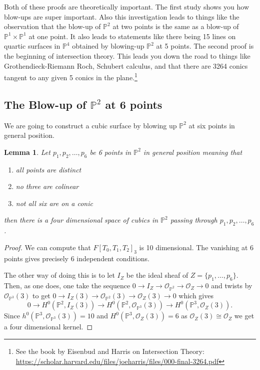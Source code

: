 \documentclass[12pt]{article}
\numberwithin{equation}{section}
\newtheorem{lemma}[theorem]{Lemma}
\theoremstyle{definition}
\theoremstyle{remark}
\newcommand{\Ocal}{\mathcal{O}}
\newcommand{\PP}{\mathbb{P}}
\begin{document}
Both of these proofs are theoretically important. 
The first study shows you how blow-ups are super important. 
Also this investigation leads to things like the observation that the blow-up of $\PP^2$ at two points is the same as a blow-up of $\PP^1\times\PP^1$ at one point. 
It also leads to statements like there being 15 lines on quartic surfaces in $\PP^4$ obtained by blowing-up $\PP^2$ at 5 points. 
The second proof is the beginning of intersection theory. 
This leads you down the road to things like Grothendieck-Riemann Roch, Schubert calculus, and that there are 3264 conics tangent to any given 5 conics in the plane.\footnote{See the book by Eisenbud and Harris on Intersection Theory: \url{https://scholar.harvard.edu/files/joeharris/files/000-final-3264.pdf}}



\subsection{The Blow-up of $\PP^2$ at 6 points}
We are going to construct a cubic surface by blowing up $\PP^2$ at six points in general position.
\begin{lemma}
	Let $p_1,p_2,\ldots,p_6$ be 6 points in $\PP^2$ in general position meaning that 
	\begin{enumerate}
		\item all points are distinct
		\item no three are colinear
		\item not all six are on a conic
	\end{enumerate}	
	then there is a four dimensional space of cubics in $\PP^2$ passing through $p_1,p_2,\ldots,p_6$.
\end{lemma}
\begin{proof}
	We can compute that $F[T_0,T_1,T_2]_3$ is 10 dimensional. 
	The vanishing at $6$ points gives precisely 6 independent conditions. 
	
	The other way of doing this is to let $I_Z$ be the ideal sheaf of $Z=\lbrace p_1,\ldots,p_6\rbrace$. 
	Then, as one does, one take the sequence $0\to I_Z \to \Ocal_{\PP^2} \to \Ocal_Z \to 0$ and twists by $\Ocal_{\PP^3}(3)$ to get $0\to I_Z(3) \to \Ocal_{\PP^2}(3) \to \Ocal_Z(3) \to 0$ which gives
	$$ 0 \to H^0(\PP^2,I_Z(3)) \to H^0(\PP^2,\Ocal_{\PP^3}(3) ) \to H^0(\PP^3,\Ocal_Z(3)). $$
	Since $h^0(\PP^3,\Ocal_{\PP^3}(3)) = 10$ and $H^0(\PP^3,\Ocal_Z(3))=6$ as $\Ocal_Z(3)\cong \Ocal_Z$ we get a four dimensional kernel. 
\end{proof}
\end{document}

